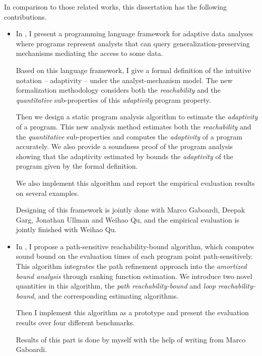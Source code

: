 In comparison to those related works, this dissertation has the following contributions.

\begin{itemize}
 \item 
 In , I present a programming language framework for adaptive data analyses where programs represent analysts that can query generalization-preserving mechanisms mediating the access to some data. 
 
 Based on this language framework, I give a formal definition of the intuitive notation -- adaptivity -- under the analyst-mechanism model.
 The new formalization methodology considers both the \emph{reachability} and the \emph{quantitative} sub-properties of this \emph{adaptivity} program property.

 Then we design a static program analysis algorithm {\THESYSTEM}
 to estimate the \emph{adaptivity} of a program. This new analysis method estimates
 both the \emph{reachability} and the \emph{quantitative} sub-properties and computes the \emph{adaptivity} of a program accurately.
 We also provide a soundness proof of the program analysis showing that the adaptivity estimated by {\THESYSTEM} bounds the \emph{adaptivity} of the program given by the formal definition. 
 
 We also implement this algorithm and report the empirical evaluation results on several examples.

 Designing of this framework is jointly done with Marco Gaboardi, Deepak Garg, Jonathan Ullman and Weihao Qu, and the empirical evaluation is jointly finished with Weihao Qu.
 
 \item In , I propose
 a path-sensitive reachability-bound algorithm, which computes sound bound on the evaluation times of each program point path-sensitively. This algorithm integrates the path refinement approach into the \emph{amortized bound analysis} through ranking function estimation.
 We introduce two novel quantities in this algorithm, the \emph{path reachability-bound} and \emph{loop reachability-bound}, and the corresponding estimating algorithms.
 
 Then I implement this algorithm as a prototype and present the evaluation results over four different benchmarks.
 
 Results of this part is done by myself with the help of writing from Marco Gaboardi.

\end{itemize} 

